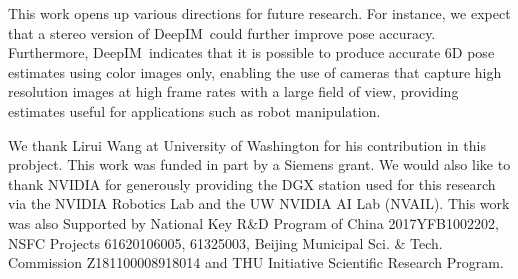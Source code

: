 \documentclass[twocolumn]{svjour3}
\newcommand{\dimnet}[0]{DeepIM}
\begin{document}
This work opens up various directions for future research. For instance, we expect that a stereo version of \dimnet\ could further improve pose accuracy. Furthermore, \dimnet\ indicates that it is possible to produce accurate 6D pose estimates using color images only, enabling the use of cameras that capture high resolution images at high frame rates with a large field of view, providing  estimates useful for applications such as robot manipulation.

\begin{acknowledgements}
We thank Lirui Wang at University of Washington for his contribution in this probject. This work was funded in part by a Siemens grant. We would also like to thank NVIDIA for generously providing the DGX station used for this research via the NVIDIA Robotics Lab and the UW NVIDIA AI Lab (NVAIL). This work was also Supported by National Key R\&D Program of China 2017YFB1002202, NSFC Projects 61620106005, 61325003, Beijing Municipal Sci. \& Tech. Commission Z181100008918014 and THU Initiative Scientific Research Program.
\end{acknowledgements}





\end{document}
